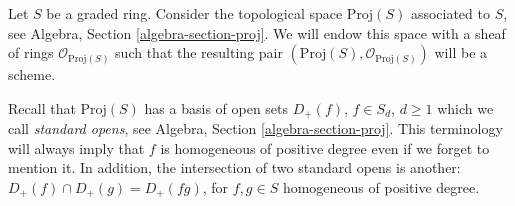 \medskip\noindent
Let $S$ be a graded ring. Consider the topological space $\text{Proj}(S)$
associated to $S$, see Algebra, Section \ref{algebra-section-proj}.
We will endow this space with a sheaf of rings $\mathcal{O}_{\text{Proj}(S)}$
such that the resulting pair $(\text{Proj}(S), \mathcal{O}_{\text{Proj}(S)})$
will be a scheme.

\medskip\noindent
Recall that $\text{Proj}(S)$ has a basis of open sets $D_{+}(f)$,
$f \in S_d$, $d \geq 1$ which we call {\it standard opens}, see Algebra,
Section \ref{algebra-section-proj}. This terminology will always
imply that $f$ is homogeneous of positive degree even if we forget to
mention it. In addition, the intersection of two standard opens is another:
$D_{+}(f) \cap D_{+}(g) = D_{+}(fg)$, for $f, g \in S$ homogeneous of positive
degree.


